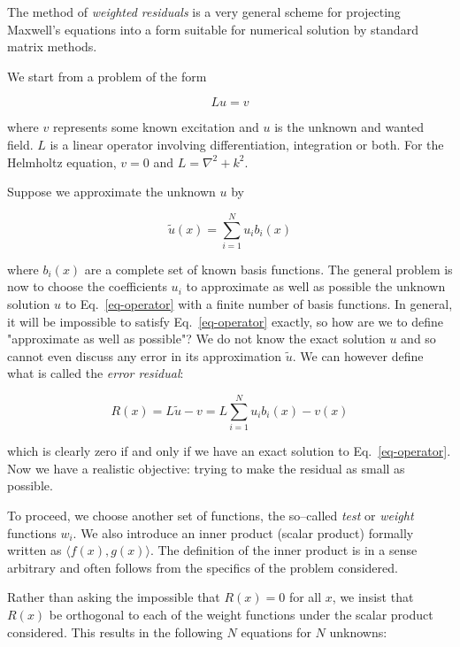 The method of \emph{weighted residuals} is a very general scheme for projecting Maxwell's equations into a form suitable for numerical solution by standard matrix methods.

We start from a problem of the form

\begin{equation}
L u = v \label{eq-operator}
\end{equation}

where $v$ represents some known excitation and $u$ is the unknown and wanted field. $L$ is a linear operator involving differentiation, integration or both. For the Helmholtz equation, $v=0$ and $L=\nabla^2 + k^2$. 

Suppose we approximate the unknown $u$ by

\begin{equation}
\tilde{u}(x) = \sum_{i=1}^N u_i b_i(x) \label{eq-expansion}
\end{equation} 

where $b_i(x)$ are a complete set of known basis functions. The general problem is now to choose the coefficients $u_i$ to approximate as well as possible the unknown solution $u$ to Eq.~\ref{eq-operator} with a finite number of basis functions. In general, it will be impossible to satisfy Eq.~\ref{eq-operator} exactly, so how are we to define "approximate as well as possible"? We do not know the exact solution $u$ and so cannot even discuss any error in its approximation $\tilde{u}$. We can however define what is called the \emph{error residual}:

\begin{equation}
R(x) = L\tilde{u} - v = L \sum_{i=1}^N u_i b_i(x) - v(x)
\end{equation} 

which is clearly zero if and only if we have an exact solution to Eq.~\ref{eq-operator}. Now we have a realistic objective: trying to make the residual as small as possible.

To proceed, we choose another set of functions, the so--called \emph{test} or \emph{weight} functions $w_i$. We also introduce an inner product (scalar product) formally written as $\langle f(x),g(x) \rangle$. The definition of the inner product is in a sense arbitrary and often follows from the specifics of the problem considered.

Rather than asking the impossible that $R(x)=0$ for all $x$, we insist that $R(x)$ be orthogonal to each of the weight functions under the scalar product considered. This results in the following $N$ equations for $N$ unknowns:

